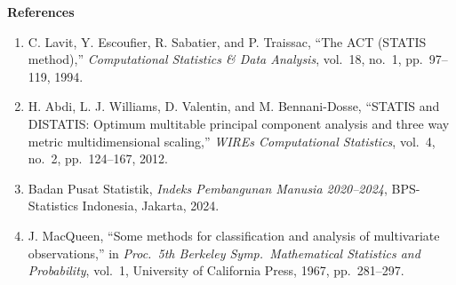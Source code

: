 \documentclass[11pt, a4paper]{article}
\begin{document}
\vspace{10pt}

\noindent\textbf{References}
\begin{enumerate}[label=\arabic*.]

\item C. Lavit, Y. Escoufier, R. Sabatier, and P. Traissac,
  ``The ACT (STATIS method),''
  \textit{Computational Statistics \& Data Analysis},
  vol.~18, no.~1, pp.~97--119, 1994.

\item H. Abdi, L. J. Williams, D. Valentin, and M. Bennani-Dosse,
  ``STATIS and DISTATIS: Optimum multitable principal component
  analysis and three way metric multidimensional scaling,''
  \textit{WIREs Computational Statistics}, vol.~4, no.~2,
  pp.~124--167, 2012.

\item Badan Pusat Statistik,
  \textit{Indeks Pembangunan Manusia 2020--2024},
  BPS-Statistics Indonesia, Jakarta, 2024.

\item J. MacQueen, ``Some methods for classification and analysis of
  multivariate observations,'' in \textit{Proc.\ 5th Berkeley Symp.\
  Mathematical Statistics and Probability}, vol.~1,
  University of California Press, 1967, pp.~281--297.

\end{enumerate}
\end{document}
